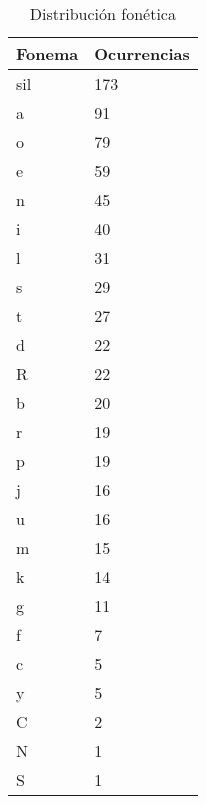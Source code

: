\begin{table}[H]
\centering
\caption{Distribución fonética}
\label{tab:distribucion_fonetica}
\begin{tabular}{|l|l|}
\hline
\textbf{Fonema} & \textbf{Ocurrencias} \\ \hline
sil & 173 \\ \hline
a   & 91  \\ \hline
o   & 79  \\ \hline
e   & 59  \\ \hline
n   & 45  \\ \hline
i   & 40  \\ \hline
l   & 31  \\ \hline
s   & 29  \\ \hline
t   & 27  \\ \hline
d   & 22  \\ \hline
R   & 22  \\ \hline
b   & 20  \\ \hline
r   & 19  \\ \hline
p   & 19  \\ \hline
j   & 16  \\ \hline
u   & 16  \\ \hline
m   & 15  \\ \hline
k   & 14  \\ \hline
g   & 11  \\ \hline
f   & 7   \\ \hline
c   & 5   \\ \hline
y   & 5   \\ \hline
C   & 2   \\ \hline
N   & 1   \\ \hline
S   & 1   \\ \hline
\end{tabular}
\end{table}